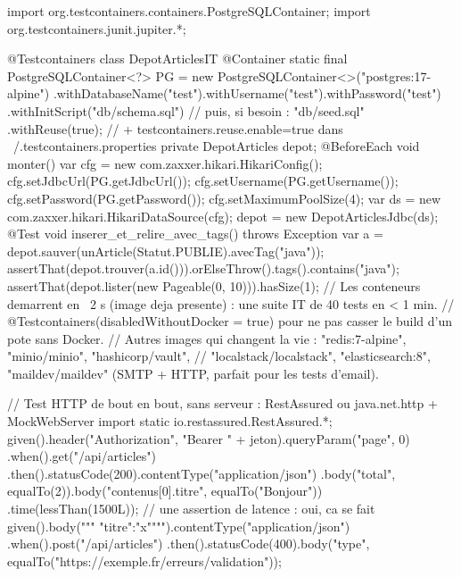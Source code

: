 \documentclass[12pt,a4paper,twoside,openright]{book}
\begin{document}
\begin{codejava}
import org.testcontainers.containers.PostgreSQLContainer;
import org.testcontainers.junit.jupiter.*;

@Testcontainers
class DepotArticlesIT {
    @Container
    static final PostgreSQLContainer<?> PG = new PostgreSQLContainer<>("postgres:17-alpine")
            .withDatabaseName("test").withUsername("test").withPassword("test")
            .withInitScript("db/schema.sql")        // puis, si besoin : "db/seed.sql"
            .withReuse(true);                       // + testcontainers.reuse.enable=true dans ~/.testcontainers.properties
    private DepotArticles depot;
    @BeforeEach void monter() {
        var cfg = new com.zaxxer.hikari.HikariConfig();
        cfg.setJdbcUrl(PG.getJdbcUrl()); cfg.setUsername(PG.getUsername()); cfg.setPassword(PG.getPassword());
        cfg.setMaximumPoolSize(4);
        var ds = new com.zaxxer.hikari.HikariDataSource(cfg);
        depot = new DepotArticlesJdbc(ds);
    }
    @Test void inserer_et_relire_avec_tags() throws Exception {
        var a = depot.sauver(unArticle(Statut.PUBLIE).avecTag("java"));
        assertThat(depot.trouver(a.id())).orElseThrow().tags().contains("java");
        assertThat(depot.lister(new Pageable(0, 10))).hasSize(1);
    }
}
// Les conteneurs demarrent en ~2 s (image deja presente) : une suite IT de 40 tests en < 1 min.
// @Testcontainers(disabledWithoutDocker = true) pour ne pas casser le build d'un pote sans Docker.
// Autres images qui changent la vie : "redis:7-alpine", "minio/minio", "hashicorp/vault",
// "localstack/localstack", "elasticsearch:8", "maildev/maildev" (SMTP + HTTP, parfait pour les tests d'email).
\end{codejava}

\begin{codejava}
// Test HTTP de bout en bout, sans serveur : RestAssured ou java.net.http + MockWebServer
import static io.restassured.RestAssured.*;
given().header("Authorization", "Bearer " + jeton).queryParam("page", 0)
   .when().get("/api/articles")
   .then().statusCode(200).contentType("application/json")
   .body("total", equalTo(2)).body("contenus[0].titre", equalTo("Bonjour"))
   .time(lessThan(1500L));                                   // une assertion de latence : oui, ca se fait
given().body("""
    {"titre":"x"}""").contentType("application/json")
   .when().post("/api/articles")
   .then().statusCode(400).body("type", equalTo("https://exemple.fr/erreurs/validation"));
\end{codejava}
\end{document}
